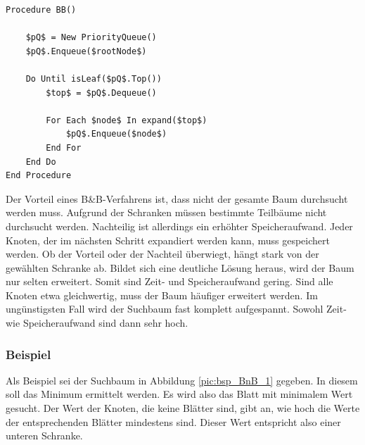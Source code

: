 \begin{lstlisting}[float=h, caption={Prinzip des Branch-and-Bound-Algorithmus},label={lst:BB}]
Procedure BB()

    $pQ$ = New PriorityQueue()
    $pQ$.Enqueue($rootNode$)

    Do Until isLeaf($pQ$.Top())
        $top$ = $pQ$.Dequeue()

        For Each $node$ In expand($top$)
            $pQ$.Enqueue($node$)
        End For
    End Do
End Procedure
\end{lstlisting}

Der Vorteil eines B\&B-Verfahrens ist, dass nicht der gesamte Baum durchsucht werden 
muss. Aufgrund der Schranken müssen bestimmte Teilbäume nicht durchsucht werden. 
Nachteilig ist allerdings ein erhöhter Speicheraufwand. Jeder Knoten, der im 
nächsten Schritt expandiert werden kann, muss gespeichert werden. 
Ob der Vorteil oder der Nachteil überwiegt, hängt stark von der gewählten Schranke ab. 
Bildet sich eine deutliche Lösung heraus, wird der Baum nur selten erweitert. Somit 
sind Zeit- und Speicheraufwand gering. Sind alle Knoten etwa gleichwertig, muss der 
Baum häufiger erweitert werden. Im ungünstigsten Fall wird der Suchbaum fast komplett 
aufgespannt. Sowohl Zeit- wie Speicheraufwand sind dann sehr hoch. 

\subsubsection{Beispiel}

Als Beispiel sei der Suchbaum in Abbildung \ref{pic:bsp_BnB_1} gegeben. In diesem soll 
das Minimum ermittelt werden. Es wird also das Blatt mit minimalem Wert gesucht. Der Wert 
der Knoten, die keine Blätter sind, gibt an, wie hoch die Werte der entsprechenden Blätter mindestens sind. 
Dieser Wert entspricht also einer unteren Schranke.



